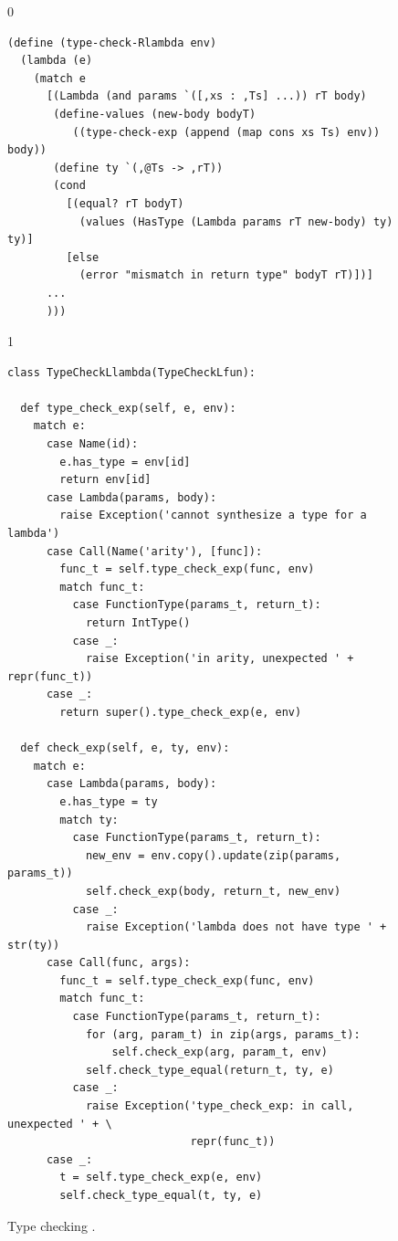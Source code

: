 \documentclass[7x10,nocrop]{TimesAPriori_MIT}%
\def\racketEd{0}
\def\pythonEd{1}
\def\edition{0}
\newcommand{\python}[1]{{\if\edition\pythonEd #1\fi}}
\begin{document}
\begin{figure}[tbp]
{\if\edition\racketEd 
\begin{lstlisting}
(define (type-check-Rlambda env)
  (lambda (e)
    (match e
      [(Lambda (and params `([,xs : ,Ts] ...)) rT body)
       (define-values (new-body bodyT) 
          ((type-check-exp (append (map cons xs Ts) env)) body))
       (define ty `(,@Ts -> ,rT))
       (cond
         [(equal? rT bodyT)
           (values (HasType (Lambda params rT new-body) ty) ty)]
         [else
           (error "mismatch in return type" bodyT rT)])]
      ...
      )))
\end{lstlisting}
\fi}
{\if\edition\pythonEd 
\begin{lstlisting}
class TypeCheckLlambda(TypeCheckLfun):

  def type_check_exp(self, e, env):
    match e:
      case Name(id):
        e.has_type = env[id]
        return env[id]
      case Lambda(params, body):
        raise Exception('cannot synthesize a type for a lambda')
      case Call(Name('arity'), [func]):
        func_t = self.type_check_exp(func, env)
        match func_t:
          case FunctionType(params_t, return_t):
            return IntType()
          case _:
            raise Exception('in arity, unexpected ' + repr(func_t))
      case _:
        return super().type_check_exp(e, env)
    
  def check_exp(self, e, ty, env):
    match e:
      case Lambda(params, body):
        e.has_type = ty
        match ty:
          case FunctionType(params_t, return_t):
            new_env = env.copy().update(zip(params, params_t))
            self.check_exp(body, return_t, new_env)
          case _:
            raise Exception('lambda does not have type ' + str(ty))
      case Call(func, args):
        func_t = self.type_check_exp(func, env)
        match func_t:
          case FunctionType(params_t, return_t):
            for (arg, param_t) in zip(args, params_t):
                self.check_exp(arg, param_t, env)
            self.check_type_equal(return_t, ty, e)
          case _:
            raise Exception('type_check_exp: in call, unexpected ' + \
                            repr(func_t))
      case _:
        t = self.type_check_exp(e, env)
        self.check_type_equal(t, ty, e)
\end{lstlisting}
\fi}
\caption{Type checking \LangLam{}\python{, part 1}.}
\label{fig:type-check-Llambda}
\end{figure}
\end{document}

